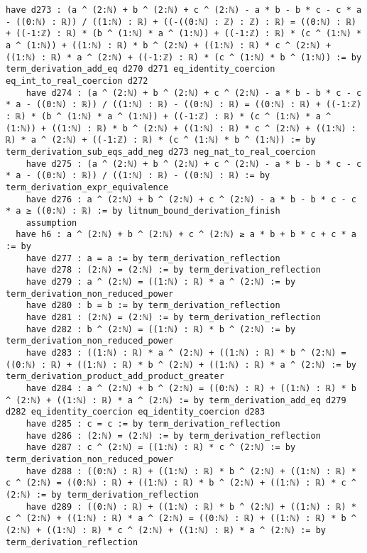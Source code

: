 \documentclass{article}
\begin{document}
\begin{tcolorbox}[colback=white!10, width=\linewidth]
\begin{lstlisting}[language=Lean4]
    have d273 : (a ^ (2:ℕ) + b ^ (2:ℕ) + c ^ (2:ℕ) - a * b - b * c - c * a - ((0:ℕ) : ℝ)) / ((1:ℕ) : ℝ) + ((-((0:ℕ) : ℤ) : ℤ) : ℝ) = ((0:ℕ) : ℝ) + ((-1:ℤ) : ℝ) * (b ^ (1:ℕ) * a ^ (1:ℕ)) + ((-1:ℤ) : ℝ) * (c ^ (1:ℕ) * a ^ (1:ℕ)) + ((1:ℕ) : ℝ) * b ^ (2:ℕ) + ((1:ℕ) : ℝ) * c ^ (2:ℕ) + ((1:ℕ) : ℝ) * a ^ (2:ℕ) + ((-1:ℤ) : ℝ) * (c ^ (1:ℕ) * b ^ (1:ℕ)) := by term_derivation_add_eq d270 d271 eq_identity_coercion eq_int_to_real_coercion d272
    have d274 : (a ^ (2:ℕ) + b ^ (2:ℕ) + c ^ (2:ℕ) - a * b - b * c - c * a - ((0:ℕ) : ℝ)) / ((1:ℕ) : ℝ) - ((0:ℕ) : ℝ) = ((0:ℕ) : ℝ) + ((-1:ℤ) : ℝ) * (b ^ (1:ℕ) * a ^ (1:ℕ)) + ((-1:ℤ) : ℝ) * (c ^ (1:ℕ) * a ^ (1:ℕ)) + ((1:ℕ) : ℝ) * b ^ (2:ℕ) + ((1:ℕ) : ℝ) * c ^ (2:ℕ) + ((1:ℕ) : ℝ) * a ^ (2:ℕ) + ((-1:ℤ) : ℝ) * (c ^ (1:ℕ) * b ^ (1:ℕ)) := by term_derivation_sub_eqs_add_neg d273 neg_nat_to_real_coercion
    have d275 : (a ^ (2:ℕ) + b ^ (2:ℕ) + c ^ (2:ℕ) - a * b - b * c - c * a - ((0:ℕ) : ℝ)) / ((1:ℕ) : ℝ) - ((0:ℕ) : ℝ) := by term_derivation_expr_equivalence
    have d276 : a ^ (2:ℕ) + b ^ (2:ℕ) + c ^ (2:ℕ) - a * b - b * c - c * a ≥ ((0:ℕ) : ℝ) := by litnum_bound_derivation_finish
    assumption
  have h6 : a ^ (2:ℕ) + b ^ (2:ℕ) + c ^ (2:ℕ) ≥ a * b + b * c + c * a := by
    have d277 : a = a := by term_derivation_reflection
    have d278 : (2:ℕ) = (2:ℕ) := by term_derivation_reflection
    have d279 : a ^ (2:ℕ) = ((1:ℕ) : ℝ) * a ^ (2:ℕ) := by term_derivation_non_reduced_power
    have d280 : b = b := by term_derivation_reflection
    have d281 : (2:ℕ) = (2:ℕ) := by term_derivation_reflection
    have d282 : b ^ (2:ℕ) = ((1:ℕ) : ℝ) * b ^ (2:ℕ) := by term_derivation_non_reduced_power
    have d283 : ((1:ℕ) : ℝ) * a ^ (2:ℕ) + ((1:ℕ) : ℝ) * b ^ (2:ℕ) = ((0:ℕ) : ℝ) + ((1:ℕ) : ℝ) * b ^ (2:ℕ) + ((1:ℕ) : ℝ) * a ^ (2:ℕ) := by term_derivation_product_add_product_greater
    have d284 : a ^ (2:ℕ) + b ^ (2:ℕ) = ((0:ℕ) : ℝ) + ((1:ℕ) : ℝ) * b ^ (2:ℕ) + ((1:ℕ) : ℝ) * a ^ (2:ℕ) := by term_derivation_add_eq d279 d282 eq_identity_coercion eq_identity_coercion d283
    have d285 : c = c := by term_derivation_reflection
    have d286 : (2:ℕ) = (2:ℕ) := by term_derivation_reflection
    have d287 : c ^ (2:ℕ) = ((1:ℕ) : ℝ) * c ^ (2:ℕ) := by term_derivation_non_reduced_power
    have d288 : ((0:ℕ) : ℝ) + ((1:ℕ) : ℝ) * b ^ (2:ℕ) + ((1:ℕ) : ℝ) * c ^ (2:ℕ) = ((0:ℕ) : ℝ) + ((1:ℕ) : ℝ) * b ^ (2:ℕ) + ((1:ℕ) : ℝ) * c ^ (2:ℕ) := by term_derivation_reflection
    have d289 : ((0:ℕ) : ℝ) + ((1:ℕ) : ℝ) * b ^ (2:ℕ) + ((1:ℕ) : ℝ) * c ^ (2:ℕ) + ((1:ℕ) : ℝ) * a ^ (2:ℕ) = ((0:ℕ) : ℝ) + ((1:ℕ) : ℝ) * b ^ (2:ℕ) + ((1:ℕ) : ℝ) * c ^ (2:ℕ) + ((1:ℕ) : ℝ) * a ^ (2:ℕ) := by term_derivation_reflection

\end{lstlisting}
\end{tcolorbox}
\end{document}
